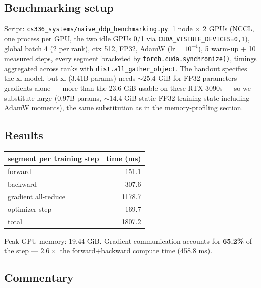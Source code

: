 \documentclass[11pt]{article}
\newcommand{\code}[1]{\texttt{#1}}
\begin{document}
\subsection{Benchmarking setup}

Script: \code{cs336\_systems/naive\_ddp\_benchmarking.py}. 1 node $\times$ 2 GPUs (NCCL,
one process per GPU, the two idle GPUs 0/1 via \code{CUDA\_VISIBLE\_DEVICES=0,1}), global batch 4
(2 per rank), ctx 512, FP32, AdamW ($\text{lr}=10^{-4}$), 5 warm-up + 10 measured steps, every
segment bracketed by \code{torch.cuda.synchronize()}, timings aggregated across ranks with
\code{dist.all\_gather\_object}. The handout specifies the xl model, but xl (3.41B params) needs
${\sim}25.4$ GiB for FP32 parameters + gradients alone --- more than the 23.6 GiB usable on these
RTX 3090s --- so we substitute large (0.97B params, ${\sim}14.4$ GiB static FP32 training state
including AdamW moments), the same substitution as in the memory-profiling section.

\subsection{Results}

\begin{center}\small
\begin{tabular}{lr}
\toprule
segment per training step & time (ms) \\
\midrule
forward             & 151.1 \\
backward            & 307.6 \\
gradient all-reduce & 1178.7 \\
optimizer step      & 169.7 \\
\midrule
total               & 1807.2 \\
\bottomrule
\end{tabular}
\end{center}

Peak GPU memory: 19.44 GiB. Gradient communication accounts for \textbf{65.2\%} of the step ---
$2.6\times$ the forward+backward compute time (458.8 ms).

\subsection{Commentary}
\end{document}
